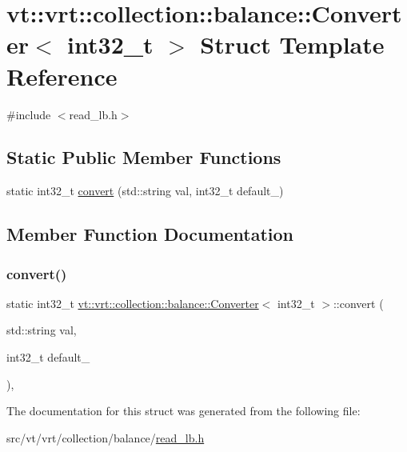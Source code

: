 \hypertarget{structvt_1_1vrt_1_1collection_1_1balance_1_1_converter_3_01int32__t_01_4}{}\section{vt\+:\+:vrt\+:\+:collection\+:\+:balance\+:\+:Converter$<$ int32\+\_\+t $>$ Struct Template Reference}
\label{structvt_1_1vrt_1_1collection_1_1balance_1_1_converter_3_01int32__t_01_4}


{\ttfamily \#include $<$read\+\_\+lb.\+h$>$}

\subsection*{Static Public Member Functions}
\begin{DoxyCompactItemize}
\item 
static int32\+\_\+t \hyperlink{structvt_1_1vrt_1_1collection_1_1balance_1_1_converter_3_01int32__t_01_4_a306f25d48360a46333f753caf0b43b91}{convert} (std\+::string val, int32\+\_\+t default\+\_\+)
\end{DoxyCompactItemize}


\subsection{Member Function Documentation}
\mbox{\label{structvt_1_1vrt_1_1collection_1_1balance_1_1_converter_3_01int32__t_01_4_a306f25d48360a46333f753caf0b43b91}} 
\subsubsection{\texorpdfstring{convert()}{convert()}}
{\footnotesize\ttfamily static int32\+\_\+t \hyperlink{structvt_1_1vrt_1_1collection_1_1balance_1_1_converter}{vt\+::vrt\+::collection\+::balance\+::\+Converter}$<$ int32\+\_\+t $>$\+::convert (\begin{DoxyParamCaption}\item[{std\+::string}]{val,  }\item[{int32\+\_\+t}]{default\+\_\+ }\end{DoxyParamCaption})\hspace{0.3cm}{\ttfamily [inline]}, {\ttfamily [static]}}



The documentation for this struct was generated from the following file\+:\begin{DoxyCompactItemize}
\item 
src/vt/vrt/collection/balance/\hyperlink{read__lb_8h}{read\+\_\+lb.\+h}\end{DoxyCompactItemize}
